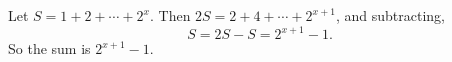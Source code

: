 Let $S=1+2+\cdots+2^x$. Then $2S=2+4+\cdots+2^{x+1}$, and subtracting,
\[
S=2S-S=2^{x+1}-1 .
\]
So the sum is $\boxed{2^{x+1}-1}$.
